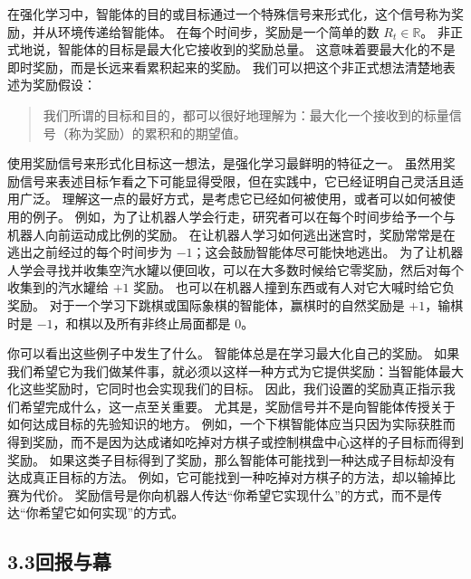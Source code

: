 \documentclass[UTF8,12pt,a4paper,fontset=fandol]{ctexart}
\begin{document}
在强化学习中，智能体的目的或目标通过一个特殊信号来形式化，这个信号称为奖励，并从环境传递给智能体。
在每个时间步，奖励是一个简单的数 $R_t\in\mathbb{R}$。
非正式地说，智能体的目标是最大化它接收到的奖励总量。
这意味着要最大化的不是即时奖励，而是长远来看累积起来的奖励。
我们可以把这个非正式想法清楚地表述为奖励假设：

\begin{quote}
我们所谓的目标和目的，都可以很好地理解为：最大化一个接收到的标量信号（称为奖励）的累积和的期望值。
\end{quote}

使用奖励信号来形式化目标这一想法，是强化学习最鲜明的特征之一。
虽然用奖励信号来表述目标乍看之下可能显得受限，但在实践中，它已经证明自己灵活且适用广泛。
理解这一点的最好方式，是考虑它已经如何被使用，或者可以如何被使用的例子。
例如，为了让机器人学会行走，研究者可以在每个时间步给予一个与机器人向前运动成比例的奖励。
在让机器人学习如何逃出迷宫时，奖励常常是在逃出之前经过的每个时间步为 $-1$；这会鼓励智能体尽可能快地逃出。
为了让机器人学会寻找并收集空汽水罐以便回收，可以在大多数时候给它零奖励，然后对每个收集到的汽水罐给 $+1$ 奖励。
也可以在机器人撞到东西或有人对它大喊时给它负奖励。
对于一个学习下跳棋或国际象棋的智能体，赢棋时的自然奖励是 $+1$，输棋时是 $-1$，和棋以及所有非终止局面都是 $0$。

你可以看出这些例子中发生了什么。
智能体总是在学习最大化自己的奖励。
如果我们希望它为我们做某件事，就必须以这样一种方式为它提供奖励：当智能体最大化这些奖励时，它同时也会实现我们的目标。
因此，我们设置的奖励真正指示我们希望完成什么，这一点至关重要。
尤其是，奖励信号并不是向智能体传授关于如何达成目标的先验知识的地方。
例如，一个下棋智能体应当只因为实际获胜而得到奖励，而不是因为达成诸如吃掉对方棋子或控制棋盘中心这样的子目标而得到奖励。
如果这类子目标得到了奖励，那么智能体可能找到一种达成子目标却没有达成真正目标的方法。
例如，它可能找到一种吃掉对方棋子的方法，却以输掉比赛为代价。
奖励信号是你向机器人传达“你希望它实现什么”的方式，而不是传达“你希望它如何实现”的方式。

\subsection*{3.3\quad 回报与幕}
\end{document}
